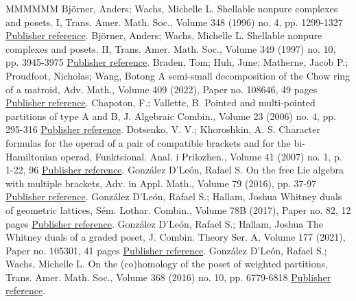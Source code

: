 \documentclass[11pt]{article}
\theoremstyle{definition}
\numberwithin{equation}{section}
\begin{document}
\begin{thebibliography}{MMMMMM}
 Björner, Anders; Wachs, Michelle L. Shellable nonpure complexes and posets. I, Trans. Amer. Math. Soc., Volume 348 (1996) no. 4, pp. 1299-1327 \href{https://alco.centre-mersenne.org/articles/10.5802/alco.455/#BjornerWachs1996}{Publisher reference}.
 Björner, Anders; Wachs, Michelle L. Shellable nonpure complexes and posets. II, Trans. Amer. Math. Soc., Volume 349 (1997) no. 10, pp. 3945-3975 \href{https://alco.centre-mersenne.org/articles/10.5802/alco.455/#BjornerWachs1997}{Publisher reference}.
 Braden, Tom; Huh, June; Matherne, Jacob P.; Proudfoot, Nicholas; Wang, Botong A semi-small decomposition of the Chow ring of a matroid, Adv. Math., Volume 409 (2022), Paper no. 108646, 49 pages \href{https://alco.centre-mersenne.org/articles/10.5802/alco.455/#BradenHuhMatherneProudfootWang2022}{Publisher reference}.
 Chapoton, F.; Vallette, B. Pointed and multi-pointed partitions of type A and B, J. Algebraic Combin., Volume 23 (2006) no. 4, pp. 295-316 \href{https://alco.centre-mersenne.org/articles/10.5802/alco.455/#ChapotonVallete2006}{Publisher reference}.
 Dotsenko, V. V.; Khoroshkin, A. S. Character formulas for the operad of a pair of compatible brackets and for the bi-Hamiltonian operad, Funktsional. Anal. i Prilozhen., Volume 41 (2007) no. 1, p. 1-22, 96 \href{https://alco.centre-mersenne.org/articles/10.5802/alco.455/#DotsenkoKhoroshkin2007}{Publisher reference}.
 González D’León, Rafael S. On the free Lie algebra with multiple brackets, Adv. in Appl. Math., Volume 79 (2016), pp. 37-97 \href{https://alco.centre-mersenne.org/articles/10.5802/alco.455/#Gonzalez2016}{Publisher reference}.
 González D’León, Rafael S.; Hallam, Joshua Whitney duals of geometric lattices, Sém. Lothar. Combin., Volume 78B (2017), Paper no. 82, 12 pages \href{https://alco.centre-mersenne.org/articles/10.5802/alco.455/#GonzalezHallam2017}{Publisher reference}.
 González D’León, Rafael S.; Hallam, Joshua The Whitney duals of a graded poset, J. Combin. Theory Ser. A, Volume 177 (2021), Paper no. 105301, 41 pages \href{https://alco.centre-mersenne.org/articles/10.5802/alco.455/#GonzalezHallam2021}{Publisher reference}.
 González D’León, Rafael S.; Wachs, Michelle L. On the (co)homology of the poset of weighted partitions, Trans. Amer. Math. Soc., Volume 368 (2016) no. 10, pp. 6779-6818 \href{https://alco.centre-mersenne.org/articles/10.5802/alco.455/#GonzalezDleonWachs2016}{Publisher reference}.

\end{thebibliography}
\end{document}

